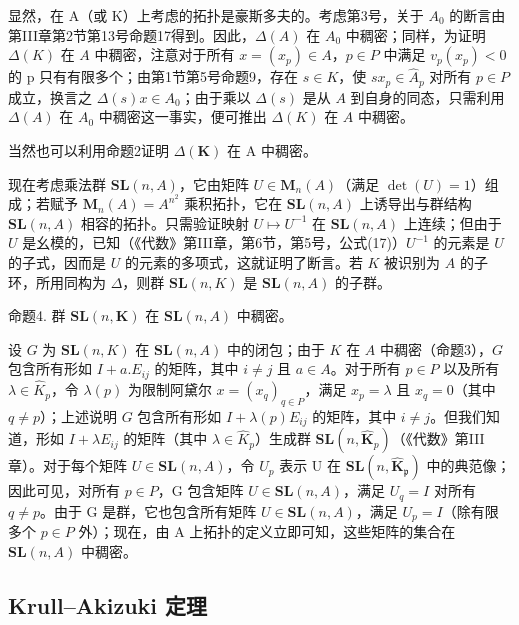 显然，在 A（或 K）上考虑的拓扑是豪斯多夫的。考虑第3号，关于 \(A_{0}\) 的断言由第III章第2节第13号命题17得到。因此，\(\Delta(A)\) 在 \(A_{0}\) 中稠密；同样，为证明 \(\Delta(K)\) 在 \(A\) 中稠密，注意对于所有 \(x = (x_{p}) \in A\)，\(p \in P\) 中满足 \(v_{p}(x_{p}) < 0\) 的 p 只有有限多个；由第1节第5号命题9，存在 \(s \in K\)，使 \(sx_{p} \in \hat{A}_{p}\) 对所有 \(p \in P\) 成立，换言之 \(\Delta(s)x \in A_{0}\)；由于乘以 \(\Delta(s)\) 是从 \(A\) 到自身的同态，只需利用 \(\Delta(A)\) 在 \(A_{0}\) 中稠密这一事实，便可推出 \(\Delta(K)\) 在 \(A\) 中稠密。

当然也可以利用命题2证明 \(\Delta(\mathbf{K})\) 在 A 中稠密。

现在考虑乘法群 \(\mathbf{SL}(n, A)\)，它由矩阵 \(U \in \mathbf{M}_n(A)\)（满足 \(\det(U) = 1\)）组成；若赋予 \(\mathbf{M}_n(A) = A^{n^2}\) 乘积拓扑，它在 \(\mathbf{SL}(n, A)\) 上诱导出与群结构 \(\mathbf{SL}(n, A)\) 相容的拓扑。只需验证映射 \(U \mapsto U^{-1}\) 在 \(\mathbf{SL}(n, A)\) 上连续；但由于 \(U\) 是幺模的，已知（《代数》第III章，第6节，第5号，公式(17)）\(U^{-1}\) 的元素是 \(U\) 的子式，因而是 \(U\) 的元素的多项式，这就证明了断言。若 \(K\) 被识别为 \(A\) 的子环，所用同构为 \(\Delta\)，则群 \(\mathbf{SL}(n, K)\) 是 \(\mathbf{SL}(n, A)\) 的子群。

命题4. 群 \(\mathbf{SL}(n, \mathbf{K})\) 在 \(\mathbf{SL}(n, A)\) 中稠密。

设 \(G\) 为 \(\mathbf{SL}(n, K)\) 在 \(\mathbf{SL}(n, A)\) 中的闭包；由于 \(K\) 在 \(A\) 中稠密（命题3），\(G\) 包含所有形如 \(I + a.E_{ij}\) 的矩阵，其中 \(i \neq j\) 且 \(a \in A\)。对于所有 \(p \in P\) 以及所有 \(\lambda \in \hat{K}_p\)，令 \(\lambda(p)\) 为限制阿黛尔 \(x = (x_q)_{q \in P}\)，满足 \(x_p = \lambda\) 且 \(x_q = 0\)（其中 \(q \neq p\)）；上述说明 \(G\) 包含所有形如 \(I + \lambda(p)E_{ij}\) 的矩阵，其中 \(i \neq j\)。但我们知道，形如 \(I + \lambda E_{ij}\) 的矩阵（其中 \(\lambda \in \hat{K}_p\)）生成群 \(\mathbf{SL}(n, \hat{\mathbf{K}}_p)\)（《代数》第III章）。对于每个矩阵 \(U \in \mathbf{SL}(n, A)\)，令 \(U_{p}\) 表示 U 在 \(\mathbf{SL}(n, \hat{\mathbf{K}}_{\mathfrak{p}})\) 中的典范像；因此可见，对所有 \(p \in P\)，G 包含矩阵 \(U \in \mathbf{SL}(n, A)\)，满足 \(U_{q} = I\) 对所有 \(q \neq p\)。由于 G 是群，它也包含所有矩阵 \(U \in \mathbf{SL}(n, A)\)，满足 \(U_{p} = I\)（除有限多个 \(p \in P\) 外）；现在，由 A 上拓扑的定义立即可知，这些矩阵的集合在 \(\mathbf{SL}(n, A)\) 中稠密。

\subsection{Krull–Akizuki 定理}

